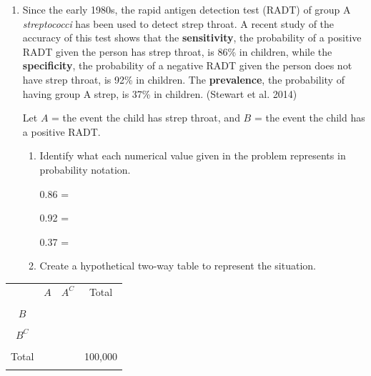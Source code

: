 \documentclass[
]{report}
\begin{document}
\begin{enumerate}
\def\labelenumi{\arabic{enumi}.}
\setcounter{enumi}{2}
\item
  Since the early 1980s, the rapid antigen detection test (RADT) of group A \emph{streptococci} has been used to detect strep throat. A recent study of the accuracy of this test shows that the \textbf{sensitivity}, the probability of a positive RADT given the person has strep throat, is 86\% in children, while the \textbf{specificity}, the probability of a negative RADT given the person does not have strep throat, is 92\% in children. The \textbf{prevalence}, the probability of having group A strep, is 37\% in children. (Stewart et al. 2014)
  \vspace{1mm}

  Let \(A\) = the event the child has strep throat, and \(B\) = the event the child has a positive RADT.
  \vspace{0.1in}

  \begin{enumerate}
  \def\labelenumii{\alph{enumii}.}
  \item
    Identify what each numerical value given in the problem represents in probability notation.
    \vspace{.1in}

    0.86 =\\
    \vspace{.1in}

    0.92 =\\
    \vspace{.1in}

    0.37 =\\
    \vspace{.1in}
  \item
    Create a hypothetical two-way table to represent the situation.
  \end{enumerate}
\end{enumerate}

\begin{center}
\begin{tabular}{|c|c|c|c|} \hline
\hspace{0.8in} & \hspace{0.35in} $A$ \hspace{.35in} & \hspace{0.35in} $A^C$  \hspace{0.35in} & \hspace{0.3in} Total \hspace{0.3in} \\ 
& & & \\ \hline
$B$& & & \\ 
& & & \\ \hline
$B^C$& & & \\ 
& & & \\ \hline
Total & & & 100,000 \\ 
& & & \\ \hline
\end{tabular}
\end{center}
\vspace{.1in}
\end{document}
